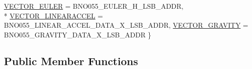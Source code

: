 \begin{DoxyCompactItemize}
\hyperlink{classAdafruit__BNO055_aca6c5acffc9a752e5309ff2bb21f3e25af512e6567f6decb1c18af65b5cb1d539}{V\+E\+C\+T\+O\+R\+\_\+\+E\+U\+L\+ER} = B\+N\+O055\+\_\+\+E\+U\+L\+E\+R\+\_\+\+H\+\_\+\+L\+S\+B\+\_\+\+A\+D\+DR, 
\\*
\hyperlink{classAdafruit__BNO055_aca6c5acffc9a752e5309ff2bb21f3e25a8bef16d23fcf2d87d568273a1c1d022d}{V\+E\+C\+T\+O\+R\+\_\+\+L\+I\+N\+E\+A\+R\+A\+C\+C\+EL} = B\+N\+O055\+\_\+\+L\+I\+N\+E\+A\+R\+\_\+\+A\+C\+C\+E\+L\+\_\+\+D\+A\+T\+A\+\_\+\+X\+\_\+\+L\+S\+B\+\_\+\+A\+D\+DR, 
\hyperlink{classAdafruit__BNO055_aca6c5acffc9a752e5309ff2bb21f3e25a0bcfa0920b42abb820f6a4563cb4ef08}{V\+E\+C\+T\+O\+R\+\_\+\+G\+R\+A\+V\+I\+TY} = B\+N\+O055\+\_\+\+G\+R\+A\+V\+I\+T\+Y\+\_\+\+D\+A\+T\+A\+\_\+\+X\+\_\+\+L\+S\+B\+\_\+\+A\+D\+DR
 \}
\end{DoxyCompactItemize}
\subsection*{Public Member Functions}
